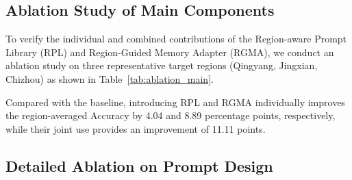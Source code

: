 \documentclass[letterpaper]{article} %
\begin{document}
\subsection{Ablation Study of Main Components}
To verify the individual and combined contributions of the Region-aware Prompt Library (RPL) and Region-Guided Memory Adapter (RGMA), we conduct an ablation study on three representative target regions (Qingyang, Jingxian, Chizhou) as shown in Table~\ref{tab:ablation_main}.

\begin{table}[t]
\centering
\caption{Ablation study of main components on three representative target regions (Qing., Jing., Chiz.) and their average (Avg.).}
\label{tab:ablation_main}
\end{table}

Compared with the baseline, introducing RPL and RGMA individually improves the region-averaged Accuracy by 4.04 and 8.89 percentage points, respectively, while their joint use provides an improvement of 11.11 points.

\subsection{Detailed Ablation on Prompt Design}
\end{document}
